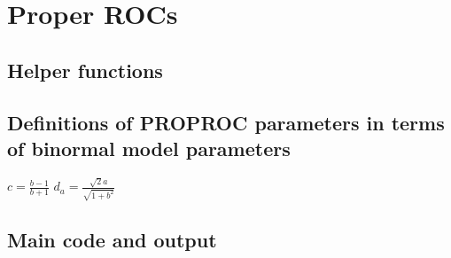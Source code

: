 \documentclass[]{book}
\begin{document}
\hypertarget{ProperROCs}{%
\chapter{Proper ROCs}\label{ProperROCs}}

\hypertarget{helper-functions}{%
\section{Helper functions}\label{helper-functions}}

\hypertarget{definitions-of-proproc-parameters-in-terms-of-binormal-model-parameters}{%
\section{Definitions of PROPROC parameters in terms of binormal model parameters}\label{definitions-of-proproc-parameters-in-terms-of-binormal-model-parameters}}

\(c=\frac{b-1}{b+1}\)
\({d_a}=\frac{\sqrt{2}a}{\sqrt{1+{b^{2}}}}\)

\hypertarget{main-code-and-output}{%
\section{Main code and output}\label{main-code-and-output}}
\end{document}
